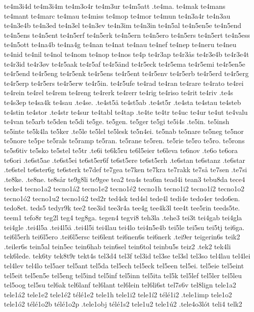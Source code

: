 {{te4m3i4d
te4m3i4m
te4m3o4r
te4m3ur
te4m5att
.te4ma.
te4mak
te4mans
te4mant
te4marc
te4mau
te4miss
te4mop
te4mor
te4mun
te4n3a4r
te4n3au
te4n3e4b
te4n3ed
te4n3el
te4n3ev
te4n3im
te4n3in
te4n5al
te4n5en5e
te4n5end
te4n5ens
te4n5ent
te4n5erf
te4n5erk
te4n5ern
te4n5ero
te4n5ers
te4n5ert
te4n5ess
te4n5ott
te4na4b
te4na4g
te4nan
te4nat
te4nau
te4nef
te4nep
te4neru
te4neu
te4nid
te4nil
te4nol
te4nom
te4nop
te4nos
te4p
te4r3ap
te4r3ås
te4r3e4b
te4r3e4t
te4r3id
te4r3øv
te4r5aak
te4r5af
te4r5änd
te4r5eck
te4r5ema
te4r5emi
te4r5en5e
te4r5end
te4r5eng
te4r5enk
te4r5ens
te4r5ent
te4r5env
te4r5erb
te4r5erd
te4r5erg
te4r5erp
te4r5ers
te4r5erw
te4r5in.
te4r5ufe
te4rad
te4ran
te4rare
te4rato
te4rei
te4rein
te4rel
te4rem
te4reng
te4rerk
te4rerr
te4rig
te4riso
te4rit
te4riv
.te4s
te4s3ep
te4sa4k
te4sau
.te4se.
.te4st5ä
te4st5ab
.te4st5r
.te4sta
te4stau
te4steb
te4stin
te4stor
.te4str
te4sur
te4tabl
te4tap
.te4te
te4tr
te4uc
te4ur
te4ut
te4valu
te4van
te5arb
te5den
te5di
te5ge.
te5gen.
te5ger
te5gi
te5i4s
.te5in.
te5insh
te5inte
te5k4la
te5ker
.te5le
te5lel
te5lesk
te5n4ei.
te5nab
te5nare
te5neg
te5nor
te5nore
te5pe
te5rals
te5ramp
te5ran.
te5rane
te5ren.
te5rie
te5ro
te5ro.
te5rons
te5s6tiv
te5sko
te5stel
te5tr
.te6i
te6k5ru
te6l5eier
te6leva
te6nov
.te6o
te6ora
te6ori
.te6st5ae
.te6st5ei
te6st5er6f
te6st5ere
te6st5erh
.te6stan
te6stanz
.te6star
.te6stel
te6ster6g
te6sterk
te7def
te7gea
te7ken
te7kra
te7rakk
te7så
te7sen
.te7si
.te8ke.
.te8ne.
te8sår
te9g8li
te9gee
tea2
tea4s
tea6m
tead4i
tean3
tebu8da
tece4
tecke4
tecno1a2
tecno1á2
tecno1e2
tecno1é2
tecno1h
tecno1i2
tecno1í2
tecno1o2
tecno1ó2
tecno1u2
tecno1ú2
ted2r
ted4sk
ted4sl
tede4l
tedi4e
tedo4er
tedo6en.
tedo8et.
teds5
tedyr9k
tee2
tee3id
tee3r4a
tee4g
tee4k3l
tee4t
tee5rin
teeds5te.
teem1
tefo8r
teg2l
teg4
teg8ga.
tegen4
tegvi8
teh3la
.tehe3
tei3t
tei4gab
tei4gla
tei4gle
.tei4l5a
.tei4l5ä
.tei4l5i
tei4lau
tei4lo
tei4n5e4b
tei5le
tei5su
tei5tj
tei6ga.
tei6l5erh
tei6l5ero
.tei6l5ersc
tei6lent
tei6nen6s
tei6nerk
.tei9er
teigerin6s
teik2
.teiler6s
tein5al
tein5ec
tein6hab
tein6sel
tein6tol
teinbu5s
teiz2
.tek2
tek4li
tek6lede.
tek6ty
tek8t9r
tekt4s
tel3d4
tel3f
tel3id
tel3se
tel3sl
tel3so
tel4lau
tel4lei
tel4lev
tel4lo
tel5aer
tel5ant
tel5da
tel5ech
tel5eck
tel5een
tel5ei.
tel5eie
tel5eint
tel5eit
tel5en5e
tel5eng
tel5ind
tel5inf
tel5inn
tel5ita
tel5k
tel5lef
tel5ler
tel5leu
tel5oog
tel5su
tel6ak
tel6lanf
tel6lant
tel6lein
tel6li6st
tel7s6v
tel8lign
tele1a2
tele1á2
tele1e2
tele1é2
télé1e2
tele1h
tele1i2
tele1í2
télé1i2
.tele1imp
tele1o2
tele1ó2
télé1o2b
télé1o2p
.tele1obj
télé1s2
tele1u2
tele1ú2
.tele4o3lót
teli4
telk2
}}
